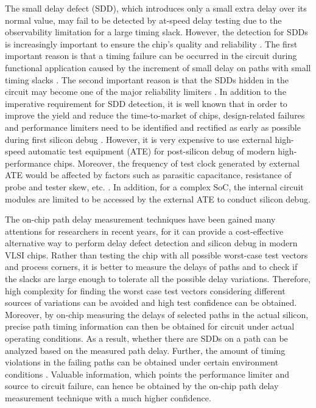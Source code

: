 The small delay defect (SDD), which introduces only a small extra delay over its normal value, may fail to be detected by at-speed delay testing due to the observability limitation for a large timing slack. However, the detection for SDDs is increasingly important to ensure the chip’s quality and reliability \cite{menon2009output} \cite{ahmed2006novel}. The first important reason is that a timing failure can be occurred in the circuit during functional application caused by the increment of small delay on paths with small timing slacks \cite{kruseman2004hazard}. The second important reason is that the SDDs hidden in the circuit may become one of the major reliability limiters \cite{nigh2000test} \cite{tayade2008small}. In addition to the imperative requirement for SDD detection, it is well known that in order to improve the yield and reduce the time-to-market of chips, design-related failures and performance limiters need to be identified and rectified as early as possible during first silicon debug \cite{balachandran2002facilitating}. However, it is very expensive to use external high-speed automatic test equipment (ATE) for post-silicon debug of modern high-performance chips. Moreover, the frequency of test clock generated by external ATE would be affected by factors such as parasitic capacitance, resistance of probe and tester skew, etc. \cite{sunter1998bist}. In addition, for a complex SoC, the internal circuit modules are limited to be accessed by the external ATE to conduct silicon debug.

The on-chip path delay measurement techniques have been gained many attentions for researchers in recent years, for it can provide a cost-effective alternative way to perform delay defect detection and silicon debug in modern VLSI chips. Rather than testing the chip with all possible worst-case test vectors and process corners, it is better to measure the delays of paths and to check if the slacks are large enough to tolerate all the possible delay variations. Therefore, high complexity for finding the worst case test vectors considering different sources of variations can be avoided and high test confidence can be obtained. Moreover, by on-chip measuring the delays of selected paths in the actual silicon, precise path timing information can then be obtained for circuit under actual operating conditions. As a result, whether there are SDDs on a path can be analyzed based on the measured path delay. Further, the amount of timing violations in the failing paths can be obtained under certain environment conditions \cite{datta2004delay} \cite{ datta2006scheme}. Valuable information, which points the performance limiter and source to circuit failure, can hence be obtained by the on-chip path delay measurement technique with a much higher confidence.

